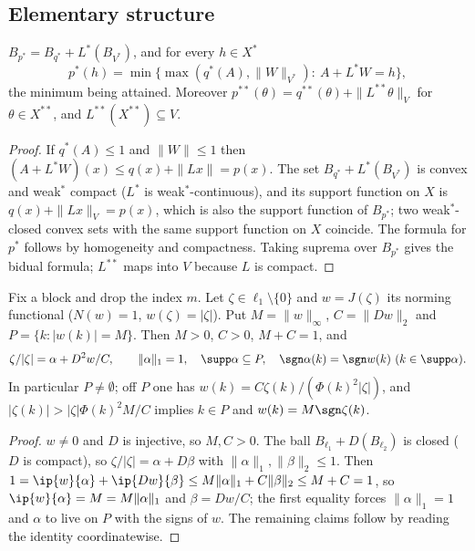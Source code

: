 \subsection{Elementary structure}

\begin{lemma}\label{lem:dualball}
$B_{p^*}=B_{q^*}+L^*(B_{V^*})$, and for every $h\in X^*$
\[
 p^*(h)=\min\{\max(q^*(A),\|W\|_{V^*}):\ A+L^*W=h\},
\]
the minimum being attained.  Moreover $p^{**}(\theta)=q^{**}(\theta)+
\|L^{**}\theta\|_V$ for $\theta\in X^{**}$, and $L^{**}(X^{**})\subseteq V$.
\end{lemma}

\begin{proof}
If $q^*(A)\le1$ and $\|W\|\le1$ then $(A+L^*W)(x)\le q(x)+\|Lx\|=p(x)$.
The set $B_{q^*}+L^*(B_{V^*})$ is convex and weak$^*$ compact ($L^*$ is
weak$^*$-continuous), and its support function on $X$ is
$q(x)+\|Lx\|_V=p(x)$, which is also the support function of $B_{p^*}$; two
weak$^*$-closed convex sets with the same support function on $X$
coincide.  The formula for $p^*$ follows by homogeneity and compactness.
Taking suprema over $B_{p^*}$ gives the bidual formula; $L^{**}$ maps into
$V$ because $L$ is compact.
\end{proof}

\begin{lemma}\label{lem:threshold}
Fix a block and drop the index $m$.  Let $\zeta\in\ell_1\setminus\{0\}$ and
$w=J(\zeta)$ its norming functional ($N(w)=1$, $w(\zeta)=|\zeta|$).  Put
$M=\|w\|_\infty$, $C=\|Dw\|_2$ and $P=\{k:|w(k)|=M\}$.  Then $M>0$, $C>0$,
$M+C=1$, and
\[
 \zeta/|\zeta|=\alpha+D^2w/C,\qquad \|\alpha\|_1=1,\quad
 \supp\alpha\subseteq P,\quad \sgn\alpha(k)=\sgn w(k)\ (k\in\supp\alpha).
\]
In particular $P\ne\emptyset$; off $P$ one has
$w(k)=C\zeta(k)/(\Phi(k)^2|\zeta|)$, and $|\zeta(k)|>|\zeta|\Phi(k)^2M/C$
implies $k\in P$ and $w(k)=M\sgn\zeta(k)$.
\end{lemma}

\begin{proof}
$w\neq0$ and $D$ is injective, so $M,C>0$.  The ball
$B_{\ell_1}+D(B_{\ell_2})$ is closed ($D$ is compact), so
$\zeta/|\zeta|=\alpha+D\beta$ with $\|\alpha\|_1,\|\beta\|_2\le1$.  Then
$1=\ip{w}{\alpha}+\ip{Dw}{\beta}\le M\|\alpha\|_1+C\|\beta\|_2\le M+C=1$,
so $\ip{w}{\alpha}=M=M\|\alpha\|_1$ and $\beta=Dw/C$; the first equality
forces $\|\alpha\|_1=1$ and $\alpha$ to live on $P$ with the signs of $w$.
The remaining claims follow by reading the identity coordinatewise.
\end{proof}

